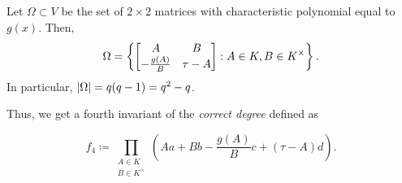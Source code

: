 \documentclass[12pt]{article}
\begin{document}
	\begin{thm}
		Let $\Omega \subset V$ be the set of $2 \times 2$ matrices with characteristic polynomial equal to $g(x)$. 
		Then,
		\begin{equation*} 
			\Omega = \left\{\begin{bmatrix} A & B \\ -\frac{g(A)}{B} & \tau - A \end{bmatrix} : A \in K , B \in K^{\times}\right\}.
		\end{equation*}
		In particular, ${\left\lvert \Omega \right\lvert} = q(q - 1) = q^{2} - q$.
	\end{thm}

	Thus, we get a fourth invariant of the \emph{correct degree} defined as

	\begin{tcolorbox}
		\begin{equation*} 
			f_{4} \coloneqq \prod_{\substack{A \in K \\ B \in K^{\times}}} \left(Aa + Bb - \frac{g(A)}{B} c + (\tau - A) d\right).
		\end{equation*}
	\end{tcolorbox}
\end{document}
